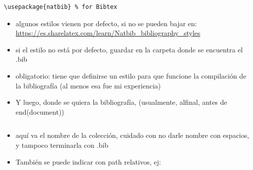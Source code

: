 \documentclass[
  11pt,
]{book}
\providecommand{\tightlist}{%
  \setlength{\itemsep}{0pt}\setlength{\parskip}{0pt}}
\begin{document}
\begin{verbatim}
\usepackage{natbib} % for Bibtex

\end{verbatim}

\begin{itemize}
\tightlist
\item
  algunos estilos vienen por defecto, si no se pueden bajar en: \url{https://es.sharelatex.com/learn/Natbib_bibliography_styles}
\item
  si el estilo no está por defecto, guardar en la carpeta donde se encuentra el .bib
\item
  obligatorio: tiene que definirse un estilo para que funcione la compilación de la bibliografía (al menos esa fue mi experiencia)
\item
  Y luego, donde se quiera la bibliografía, (usualmente, alfinal, antes de end(document))
\end{itemize}

\begin{verbatim}

\end{verbatim}

\begin{itemize}
\tightlist
\item
  aquí va el nombre de la colección, cuidado con no darle nombre con espacios, y tampoco terminarla con .bib
\item
  También se puede indicar con path relativos, ej:
\end{itemize}

\begin{verbatim}
 
\end{verbatim}
\end{document}
